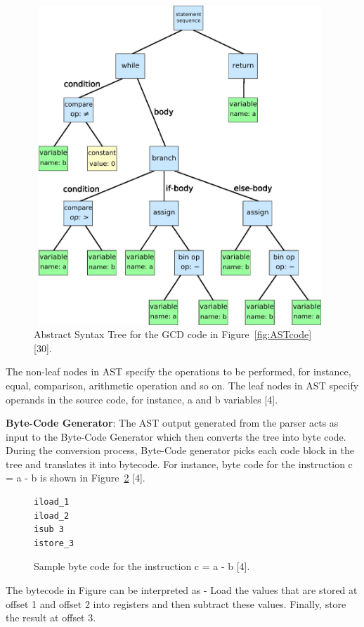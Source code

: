 \begin{figure}
  \centering
      \includegraphics[width=11cm, height=12cm]{AST.jpg}
    \caption[Abstract Syntax Tree]{Abstract Syntax Tree for the GCD code in Figure~\ref{fig:ASTcode} [30].}
    \label{fig:AST}
\end{figure}
The non-leaf nodes in AST specify the operations to be performed, for instance, equal, comparison, arithmetic operation and so on. The leaf nodes in AST specify operands in the source code, for instance, a and b variables [4]. 

\textbf{Byte-Code Generator}: The AST output generated from the parser acts as input to the Byte-Code Generator which then converts the tree into byte code. During the conversion process, Byte-Code generator picks each code block in the tree and translates it into bytecode. For instance, byte code for the instruction c = a - b is shown in Figure~\ref{fig:samplebytecode} [4].

\begin{figure}
  \centering
\begin{lstlisting}
iload_1
iload_2
isub 3
istore_3
\end{lstlisting}
    \caption[Sample byte code]{Sample byte code for the instruction c = a - b [4].}
    \label{fig:samplebytecode}
\end{figure}

The bytecode in Figure can be interpreted as - Load the values that are stored at offset 1 and offset 2 into registers and then subtract these values. Finally, store the result at offset 3.

